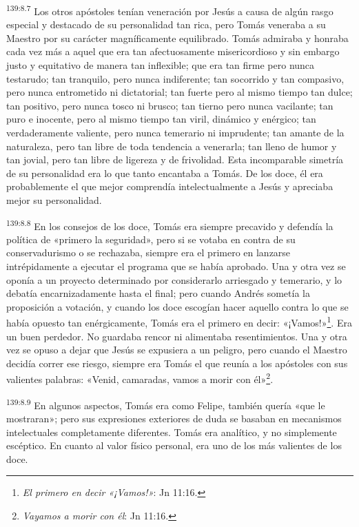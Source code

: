 \par 
\textsuperscript{139:8.7} Los otros apóstoles tenían veneración por Jesús a causa de algún rasgo especial y destacado de su personalidad tan rica, pero Tomás veneraba a su Maestro por su carácter magníficamente equilibrado. Tomás admiraba y honraba cada vez más a aquel que era tan afectuosamente misericordioso y sin embargo justo y equitativo de manera tan inflexible; que era tan firme pero nunca testarudo; tan tranquilo, pero nunca indiferente; tan socorrido y tan compasivo, pero nunca entrometido ni dictatorial; tan fuerte pero al mismo tiempo tan dulce; tan positivo, pero nunca tosco ni brusco; tan tierno pero nunca vacilante; tan puro e inocente, pero al mismo tiempo tan viril, dinámico y enérgico; tan verdaderamente valiente, pero nunca temerario ni imprudente; tan amante de la naturaleza, pero tan libre de toda tendencia a venerarla; tan lleno de humor y tan jovial, pero tan libre de ligereza y de frivolidad. Esta incomparable simetría de su personalidad era lo que tanto encantaba a Tomás. De los doce, él era probablemente el que mejor comprendía intelectualmente a Jesús y apreciaba mejor su personalidad.

\par 
\textsuperscript{139:8.8} En los consejos de los doce, Tomás era siempre precavido y defendía la política de «primero la seguridad», pero si se votaba en contra de su conservadurismo o se rechazaba, siempre era el primero en lanzarse intrépidamente a ejecutar el programa que se había aprobado. Una y otra vez se oponía a un proyecto determinado por considerarlo arriesgado y temerario, y lo debatía encarnizadamente hasta el final; pero cuando Andrés sometía la proposición a votación, y cuando los doce escogían hacer aquello contra lo que se había opuesto tan enérgicamente, Tomás era el primero en decir: «¡Vamos!»\footnote{\textit{El primero en decir «¡Vamos!»}: Jn 11:16.}. Era un buen perdedor. No guardaba rencor ni alimentaba resentimientos. Una y otra vez se opuso a dejar que Jesús se expusiera a un peligro, pero cuando el Maestro decidía correr ese riesgo, siempre era Tomás el que reunía a los apóstoles con sus valientes palabras: «Venid, camaradas, vamos a morir con él»\footnote{\textit{Vayamos a morir con él}: Jn 11:16.}.

\par 
\textsuperscript{139:8.9} En algunos aspectos, Tomás era como Felipe, también quería «que le mostraran»; pero sus expresiones exteriores de duda se basaban en mecanismos intelectuales completamente diferentes. Tomás era analítico, y no simplemente escéptico. En cuanto al valor físico personal, era uno de los más valientes de los doce.

